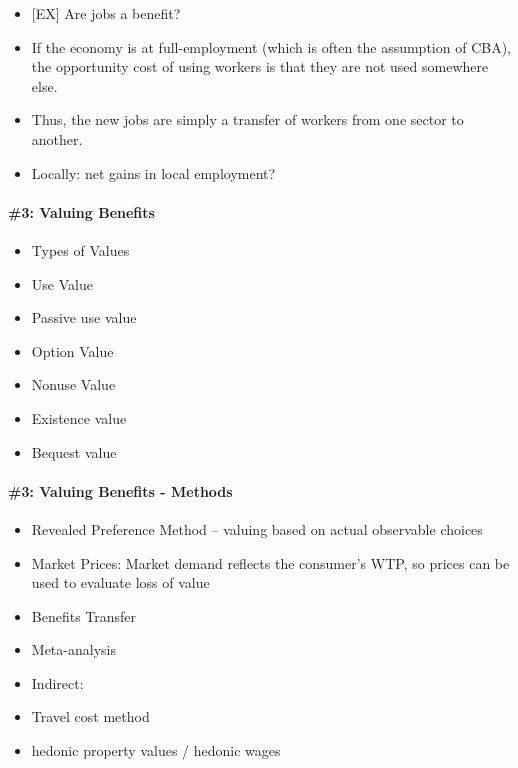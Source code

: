 \documentclass[]{article}
\providecommand{\tightlist}{%
  \setlength{\itemsep}{0pt}\setlength{\parskip}{0pt}}
\let\oldparagraph\paragraph
\renewcommand{\paragraph}[1]{\oldparagraph{#1}\mbox{}}
\begin{document}
\begin{itemize}
\tightlist
\item
  {[}EX{]} Are jobs a benefit?
\item
  If the economy is at full-employment (which is often the assumption of
  CBA), the opportunity cost of using workers is that they are not used
  somewhere else.
\item
  Thus, the new jobs are simply a transfer of workers from one sector to
  another.
\item
  Locally: net gains in local employment?
\end{itemize}

\hypertarget{valuing-benefits}{%
\paragraph{\#3: Valuing Benefits}\label{valuing-benefits}}

\begin{itemize}
\tightlist
\item
  Types of Values
\item
  Use Value
\item
  Passive use value
\item
  Option Value
\item
  Nonuse Value
\item
  Existence value
\item
  Bequest value
\end{itemize}

\hypertarget{valuing-benefits---methods}{%
\paragraph{\#3: Valuing Benefits -
Methods}\label{valuing-benefits---methods}}

\begin{itemize}
\tightlist
\item
  Revealed Preference Method -- valuing based on actual observable
  choices
\item
  Market Prices: Market demand reflects the consumer's WTP, so prices
  can be used to evaluate loss of value
\item
  Benefits Transfer
\item
  Meta-analysis
\item
  Indirect:
\item
  Travel cost method
\item
  hedonic property values / hedonic wages
\end{itemize}
\end{document}

